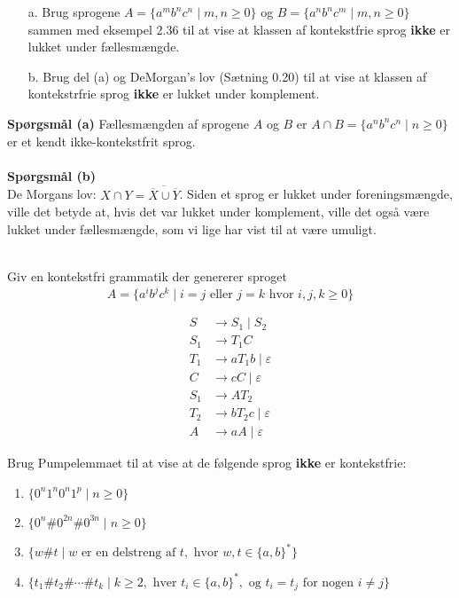 \begin{exercise}[Sipser 2.2]
  \begin{enumerate}
    \item[a.] Brug sprogene $A = \{a^{m}b^{n}c^{n} \mid m,n \ge 0\}$ og $B = \{a^{n}b^{n}c^{m} \mid m,n \ge 0\}$ sammen med eksempel 2.36 til at vise at klassen af kontekstfrie sprog \textbf{ikke} er lukket under fællesmængde.
    \item[b.] Brug del (a) og DeMorgan's lov (Sætning 0.20) til at vise at klassen af kontekstrfrie sprog \textbf{ikke} er lukket under komplement.
  \end{enumerate}
\end{exercise}
\noindent
\textbf{Spørgsmål (a)}
\noindent
Fællesmængden af sprogene $A$ og $B$ er $A \cap B = \{a^{n}b^{n}c^{n} \mid n \ge 0\}$ er et kendt ikke-kontekstfrit sprog.\\\\
\noindent
\textbf{Spørgsmål (b)}\\
\noindent
De Morgans lov: $X \cap Y = \overline{\overline{X} \cup \overline{Y}}$. Siden et sprog er lukket under foreningsmængde, ville det betyde at, hvis det var lukket under komplement, ville det også være lukket under fællesmængde, som vi lige har vist til at være umuligt.\\\\

\begin{exercise}[Sipser 2.9]
  Giv en kontekstfri grammatik der genererer sproget
  \begin{equation*}
A = \{a^{i}b^{j}c^{k} \mid i = j \text{ eller } j = k \text{ hvor } i,j,k \ge 0\}
  \end{equation*}
\end{exercise}

\begin{align*}
  S &\rightarrow S_{1} \mid S_{2} \\
  S_{1} &\rightarrow T_{1}C \\
  T_{1} &\rightarrow aT_{1}b \mid \varepsilon \\
  C &\rightarrow  cC \mid \varepsilon \\
  S_{1} &\rightarrow AT_{2} \\
  T_{2} &\rightarrow bT_{2}c \mid \varepsilon \\
  A &\rightarrow aA \mid \varepsilon
\end{align*}

\begin{exercise}[Sipser 2.30]
  Brug Pumpelemmaet til at vise at de følgende sprog \textbf{ikke} er kontekstfrie:
      \begin{enumerate}
        \item $\{0^n 1^n 0^n 1^{p} \mid n \geq 0\}$
        \item $\{0^n \# 0^{2n} \# 0^{3n} \mid n \geq 0\}$
        \item $\{w \# t \mid w \text{ er en delstreng af } t, \text{ hvor } w, t \in \{a, b\}^*\}$
        \item $\{t_1 \# t_2 \# \cdots \# t_k \mid k \geq 2, \text{ hver } t_i \in \{a, b\}^*, \text{ og } t_i = t_j \text{ for nogen } i \neq j\}$
    \end{enumerate}
\end{exercise}

